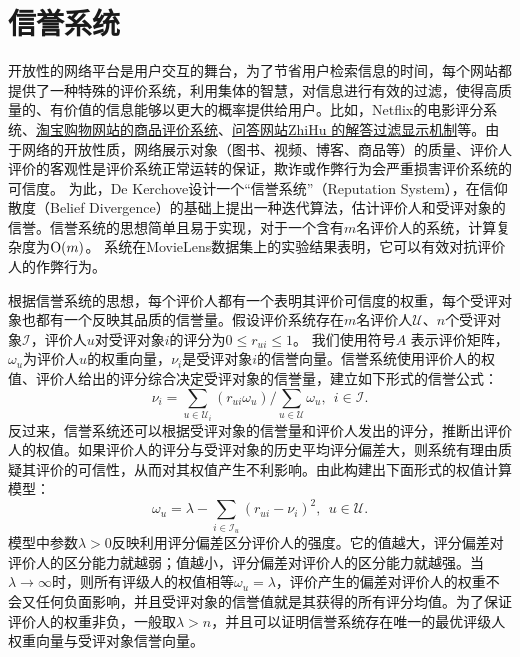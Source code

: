 \section{信誉系统}
开放性的网络平台是用户交互的舞台，为了节省用户检索信息的时间，每个网站都提供了一种特殊的评价系统，利用集体的智慧，对信息进行有效的过滤，使得高质量的、有价值的信息能够以更大的概率提供给用户。比如，Netflix的电影评分系统、\href{http://www.taobao.com/}{淘宝购物网站的商品评价系统}、\href{http://www.zhihu.com/}{问答网站ZhiHu 的解答过滤显示机制}等。由于网络的开放性质，网络展示对象（图书、视频、博客、商品等）的质量、评价人评价的客观性是评价系统正常运转的保证，欺诈或作弊行为会严重损害评价系统的可信度。
为此，De Kerchove\cite{de2007iterative,de2008reputation}设计一个“信誉系统”（Reputation System），在信仰散度（Belief Divergence）的基础上提出一种迭代算法，估计评价人和受评对象的信誉。信誉系统的思想简单且易于实现，对于一个含有$m$名评价人的系统，计算复杂度为$\operatorname{\mathrm{O}}(m)$。 系统在MovieLens数据集上的实验结果表明，它可以有效对抗评价人的作弊行为。

根据信誉系统的思想，每个评价人都有一个表明其评价可信度的权重，每个受评对象也都有一个反映其品质的信誉量。假设评价系统存在$m$名评价人$\mathcal U$、$n$个受评对象$\mathcal I$，评价人$u$对受评对象$i$的评分为$0\le r_{ui}\le 1$。 我们使用符号$A$ 表示评价矩阵，$\omega_u$为评价人$u$的权重向量，$\nu_i$是受评对象$i$的信誉向量。信誉系统使用评价人的权值、评价人给出的评分综合决定受评对象的信誉量，建立如下形式的信誉公式：
\begin{equation}\label{eq:repu-item}
    \nu_i = \sum\limits_{u\in \mathcal U_i} (r_{ui} \omega_u)/\sum\limits_{u\in \mathcal U} \omega_u,~~i\in \mathcal I.
\end{equation}
反过来，信誉系统还可以根据受评对象的信誉量和评价人发出的评分，推断出评价人的权值。如果评价人的评分与受评对象的历史平均评分偏差大，则系统有理由质疑其评价的可信性，从而对其权值产生不利影响。由此构建出下面形式的权值计算模型：
\begin{equation}\label{eq:repu-rater}
    \omega_u = \lambda - \sum\limits_{i\in \mathcal I_u} (r_{ui} - \nu_i)^2, ~~u\in \mathcal U.
\end{equation}
模型中参数$\lambda>0$反映利用评分偏差区分评价人的强度。它的值越大，评分偏差对评价人的区分能力就越弱；值越小，评分偏差对评价人的区分能力就越强。当$\lambda \rightarrow \infty$时，则所有评级人的权值相等$\omega_u= \lambda$，评价产生的偏差对评价人的权重不会又任何负面影响，并且受评对象的信誉值就是其获得的所有评分均值。为了保证评价人的权重非负，一般取$\lambda>n$，并且可以证明信誉系统存在唯一的最优评级人权重向量与受评对象信誉向量。

